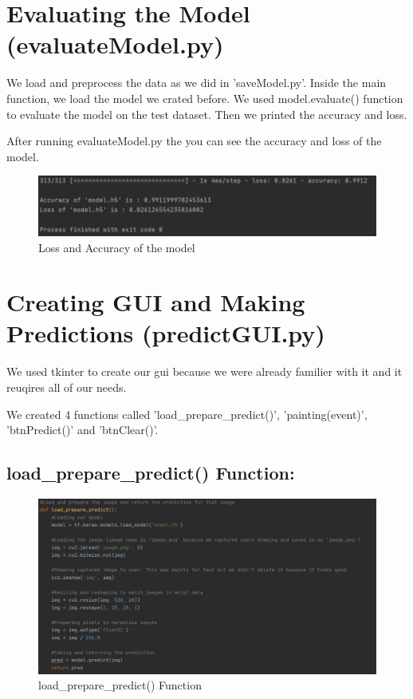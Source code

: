 \documentclass[onecolumn]{article}
\begin{document}
\section{Evaluating the Model (evaluateModel.py)}
We load and preprocess the data as we did in 'saveModel.py'. Inside the main function, we load the model we crated before. We used model.evaluate() function to evaluate the model on the test dataset. Then we printed the accuracy and loss.
\vspace{5mm}
\par After running evaluateModel.py the you can see the accuracy and loss of the model.
\begin{figure}[h!]
\centering
    \includegraphics[width=0.8\linewidth]{evaluate.PNG}
\caption{\label{}
Loss and Accuracy of the model}
\end{figure}

\section{Creating GUI and Making Predictions (predictGUI.py)}

We used tkinter to create our gui because we were already familier with it and it reuqires all of our needs. \par We created 4 functions called 'load\_prepare\_predict()', 'painting(event)', 'btnPredict()' and 'btnClear()'. 

\subsection{load\_prepare\_predict() Function:}
\begin{figure}[h!]
\centering
    \includegraphics[width=0.8\linewidth]{func1.PNG}
\caption{\label{}
load\_prepare\_predict() Function}
\end{figure}
\end{document}
